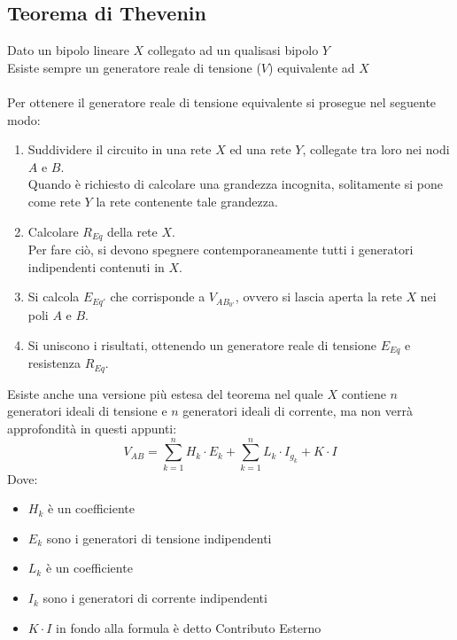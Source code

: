 \documentclass[../main.tex]{subfiles}
\begin{document}
	\subsection{Teorema di Thevenin}
	Dato un bipolo lineare $X$ collegato ad un qualisasi bipolo $Y$\\
	Esiste sempre un generatore reale di tensione ($V$) equivalente ad $X$\\\\
	Per ottenere il generatore reale di tensione equivalente si prosegue nel seguente modo:
	\begin{enumerate}
		\item Suddividere il circuito in una rete $X$ ed una rete $Y$, collegate tra loro nei nodi $A$ e $B$.\\
		Quando è richiesto di calcolare una grandezza incognita, solitamente si pone come rete $Y$ la rete contenente tale grandezza.
		\item Calcolare $R_{Eq}$ della rete $X$.\\
		Per fare ciò, si devono spegnere contemporaneamente tutti i generatori indipendenti contenuti in $X$.
		\item Si calcola $E_{Eq'}$ che corrisponde a $V_{AB_{0'}}$, ovvero si lascia aperta la rete $X$ nei poli $A$ e $B$.
		\item Si uniscono i risultati, ottenendo un generatore reale di tensione $E_{Eq}$ e resistenza $R_{Eq}$.
	\end{enumerate}
	Esiste anche una versione più estesa del teorema nel quale $X$ contiene $n$ generatori ideali di tensione e $n$ generatori ideali di corrente, ma non verrà approfondità in questi appunti:
	\[
	V_{AB} = \sum_{k=1}^{n} H_k \cdot E_k + \sum_{k=1}^{n} L_k \cdot I_{g_k} + K \cdot I
	\]
	Dove:
	\begin{itemize}
		\item $H_k$ è un coefficiente
		\item $E_k$ sono i generatori di tensione indipendenti
		\item $L_k$ è un coefficiente
		\item $I_k$ sono i generatori di corrente indipendenti
		\item $K \cdot I$ in fondo alla formula è detto Contributo Esterno
	\end{itemize}
\end{document}
